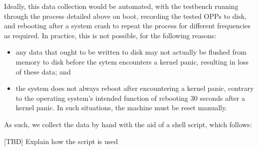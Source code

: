 Ideally, this data collection would be automated, with the testbench running
through the process detailed above on boot, recording the tested OPPs to disk,
and rebooting after a system crash to repeat the process for different
frequencies as required. In practice, this is not possible, for the following
reasons:
\begin{itemize}
    \item any data that ought to be written to disk may not actually be flushed
        from memory to disk before the sytem encounters a kernel panic, 
        resulting in loss of these data; and
    \item the system does not always reboot after encountering a kernel panic,
        contrary to the operating system's intended function of rebooting 30
        seconds after a kernel panic. In such situations, the machine must be
        reset manually.
\end{itemize}

As such, we collect the data by hand with the aid of a shell script, which
follows:



[TBD] Explain how the script is used
